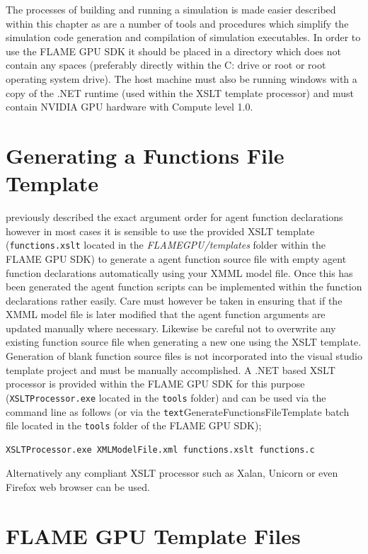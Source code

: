 \documentclass[11pt, a4paper, onecolumn, oneside]{report}
\begin{document}
The processes of building and running a simulation is made easier described within this chapter as are a number of tools and procedures which simplify the simulation code generation and compilation of simulation executables.
In order to use the FLAME GPU SDK it should be placed in a directory which does not contain any spaces (preferably directly within the C: drive or root or root operating system drive).
The host machine must also be running windows with a copy of the .NET runtime (used within the XSLT template processor) and must contain NVIDIA GPU hardware with Compute level 1.0.

\section{Generating a Functions File Template}
\label{sec:42}


 previously described the exact argument order for agent function declarations however in most cases it is sensible to use the provided XSLT template (\verb|functions.xslt| located in the \emph{FLAMEGPU/templates} folder within the FLAME GPU SDK) to generate a agent function source file with empty agent function declarations automatically using your XMML model file.
Once this has been generated the agent function scripts can be implemented within the function declarations rather easily.
Care must however be taken in ensuring that if the XMML model file is later modified that the agent function arguments are updated manually where necessary.
Likewise be careful not to overwrite any existing function source file when generating a new one using the XSLT template.
Generation of blank function source files is not incorporated into the visual studio template project and must be manually accomplished.
A .NET based XSLT processor is provided within the FLAME GPU SDK for this purpose (\verb|XSLTProcessor.exe| located in the \verb|tools| folder) and can be used via the command line as follows (or via the \verb|text|{GenerateFunctionsFileTemplate} batch file located in the \verb|tools| folder of the FLAME GPU SDK);

\begin{verbatim}
XSLTProcessor.exe XMLModelFile.xml functions.xslt functions.c
\end{verbatim}

Alternatively any compliant XSLT processor such as Xalan, Unicorn or even Firefox web browser can be used.

\section{FLAME GPU Template Files}
\label{sec:43}
\end{document}

